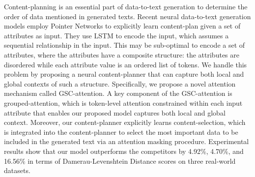 Content-planning is an essential part of data-to-text generation to determine the order of data mentioned in generated texts. Recent neural data-to-text generation models employ Pointer Networks to explicitly learn content-plan given a set of attributes as input. They use LSTM to encode the input, which assumes a sequential relationship in the input. This may be sub-optimal to encode a set of attributes, where the attributes have a composite structure: the attributes are disordered while each attribute value is an ordered list of tokens. We handle this problem by proposing a neural content-planner that can capture both local and global contexts of such a structure. Specifically, we propose a novel attention mechanism called GSC-attention. A key component of the GSC-attention is grouped-attention, which is token-level attention constrained within each input attribute that enables our proposed model captures both local and global context. Moreover, our content-planner explicitly learns content-selection, which is integrated into the content-planner to select the most important data to be included in the generated text via an attention masking procedure. Experimental results show that our model outperforms the competitors by 4.92\%, 4.70\%, and 16.56\% in terms of Damerau-Levenshtein Distance scores on three real-world datasets.

